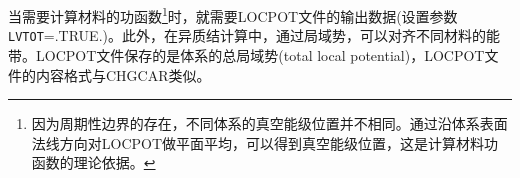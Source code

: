 当需要计算材料的功函数\footnote{因为周期性边界的存在，不同体系的真空能级位置并不相同。通过沿体系表面法线方向对LOCPOT做平面平均，可以得到真空能级位置，这是计算材料功函数的理论依据。}时，就需要\textrm{LOCPOT}文件的输出数据(设置参数\texttt{LVTOT}=\textrm{.TRUE.})。此外，在异质结计算中，通过局域势，可以对齐不同材料的能带。\textrm{LOCPOT}文件保存的是体系的总局域势\textrm{(total local potential)}，\textrm{LOCPOT}文件的内容格式与\textrm{CHGCAR}类似。
%
%
%
%
%
%
%
%
%

